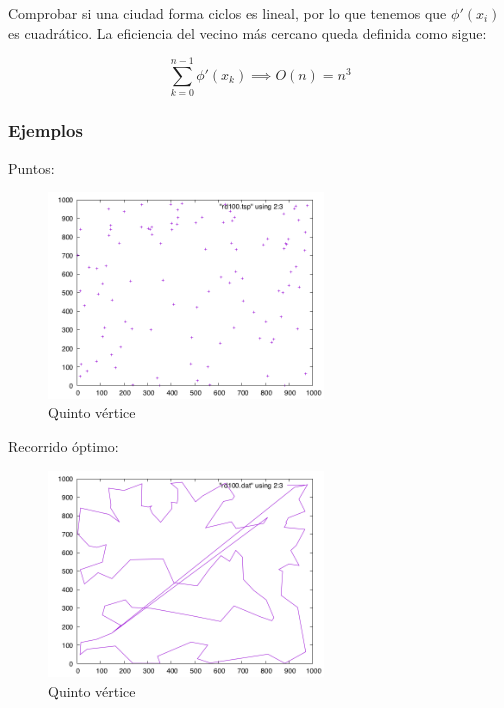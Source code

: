 Comprobar si una ciudad forma ciclos es lineal, por lo que tenemos que $\phi '(x_i)$ es cuadrático.
La eficiencia del vecino más cercano queda definida como sigue:

\[ \sum_{k=0}^{n-1}\phi ' (x_k) \implies O(n) = n^3\]

\newpage
\subsubsection{Ejemplos}
Puntos:

	\begin{figure}[htbH]
		\centering
		\includegraphics[width=0.65\textwidth]{../Viajante/Imagenes/rd100.png}
		\caption{Quinto vértice}
	\end{figure}
	
Recorrido óptimo:

	\begin{figure}[htbH]
		\centering
		\includegraphics[width=0.65\textwidth]{../Viajante/Imagenes/rd100_opt.png}
		\caption{Quinto vértice}
	\end{figure}
\newpage